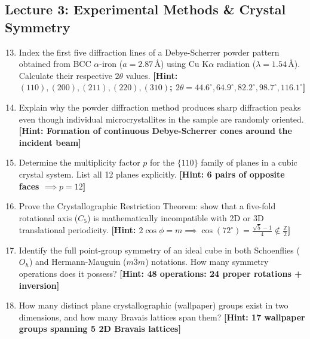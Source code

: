 \documentclass[11pt,a4paper]{article}
\begin{document}
\subsection*{Lecture 3: Experimental Methods \& Crystal Symmetry}
\begin{enumerate}[leftmargin=1.8em, label=\textbf{3.\arabic*}]
    \setcounter{enumi}{12}
    \item Index the first five diffraction lines of a Debye-Scherrer powder pattern obtained from BCC $\alpha$-iron ($a = 2.87\,\text{\AA}$) using Cu K$\alpha$ radiation ($\lambda = 1.54\,\text{\AA}$). Calculate their respective $2\theta$ values. \hfill \textbf{[Hint: $(110), (200), (211), (220), (310)$; $2\theta = 44.6^\circ, 64.9^\circ, 82.2^\circ, 98.7^\circ, 116.1^\circ$]}
    \item Explain why the powder diffraction method produces sharp diffraction peaks even though individual microcrystallites in the sample are randomly oriented. \hfill \textbf{[Hint: Formation of continuous Debye-Scherrer cones around the incident beam]}
    \item Determine the multiplicity factor $p$ for the $\{110\}$ family of planes in a cubic crystal system. List all 12 planes explicitly. \hfill \textbf{[Hint: 6 pairs of opposite faces $\implies p = 12$]}
    \item Prove the Crystallographic Restriction Theorem: show that a five-fold rotational axis ($C_5$) is mathematically incompatible with 2D or 3D translational periodicity. \hfill \textbf{[Hint: $2\cos\phi = m \implies \cos(72^\circ) = \frac{\sqrt{5}-1}{4} \notin \frac{\mathbb{Z}}{2}$]}
    \item Identify the full point-group symmetry of an ideal cube in both Schoenflies ($O_h$) and Hermann-Mauguin ($m\bar{3}m$) notations. How many symmetry operations does it possess? \hfill \textbf{[Hint: 48 operations: 24 proper rotations + inversion]}
    \item How many distinct plane crystallographic (wallpaper) groups exist in two dimensions, and how many Bravais lattices span them? \hfill \textbf{[Hint: 17 wallpaper groups spanning 5 2D Bravais lattices]}
\end{enumerate}
\end{document}
